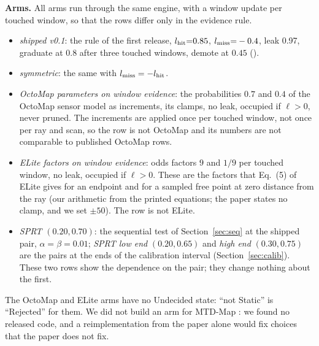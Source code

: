 \noindent\textbf{Arms.} All arms run through the same engine, with a window update per touched window, so that the rows differ only in the evidence rule.
\begin{itemize}
  \item \emph{shipped v0.1}: the rule of the first release, $l_{\mathrm{hit}}{=}0.85$, $l_{\mathrm{miss}}{=}-0.4$, leak 0.97, graduate at $0.8$ after three touched windows, demote at $0.45$ ().
  \item \emph{symmetric}: the same with $l_{\mathrm{miss}}=-l_{\mathrm{hit}}$.
  \item \emph{OctoMap parameters on window evidence}: the probabilities $0.7$ and $0.4$ of the OctoMap sensor model \citep{hornung2013octomap} as increments, its clamps, no leak, occupied if $\ell>0$, never pruned. The increments are applied once per touched window, not once per ray and scan, so the row is not OctoMap and its numbers are not comparable to published OctoMap rows.
  \item \emph{ELite factors on window evidence}: odds factors $9$ and $1/9$ per touched window, no leak, occupied if $\ell>0$. These are the factors that Eq.~(5) of ELite \citep{gil2025elite} gives for an endpoint and for a sampled free point at zero distance from the ray (our arithmetic from the printed equations; the paper states no clamp, and we set $\pm50$). The row is not ELite.
  \item \emph{SPRT $(0.20,0.70)$}: the sequential test of Section~\ref{sec:seq} at the shipped pair, $\alpha=\beta=0.01$; \emph{SPRT low end} $(0.20,0.65)$ and \emph{high end} $(0.30,0.75)$ are the pairs at the ends of the calibration interval (Section~\ref{sec:calib}). These two rows show the dependence on the pair; they change nothing about the first.
\end{itemize}
The OctoMap and ELite arms have no Undecided state: ``not Static'' is ``Rejected'' for them. We did not build an arm for MTD-Map \citep{kim2026mtdmap}: we found no released code, and a reimplementation from the paper alone would fix choices that the paper does not fix.


